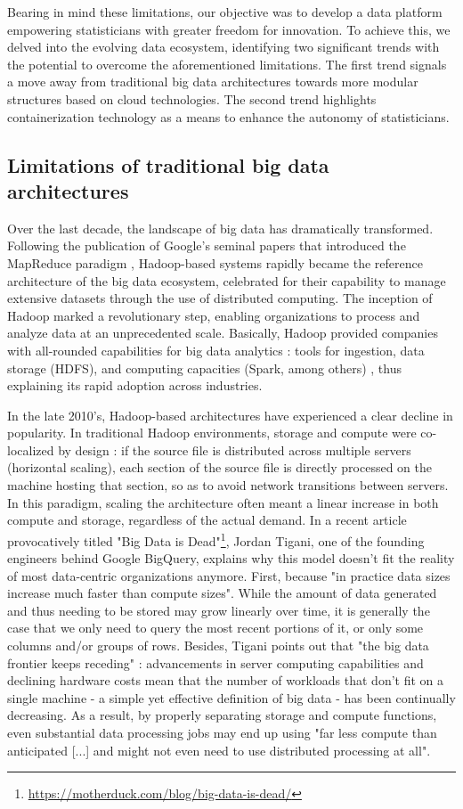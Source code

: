 Bearing in mind these limitations, our objective was to develop a data platform empowering statisticians with greater freedom for innovation. To achieve this, we delved into the evolving data ecosystem, identifying two significant trends with the potential to overcome the aforementioned limitations. The first trend signals a move away from traditional big data architectures towards more modular structures based on cloud technologies. The second trend highlights containerization technology as a means to enhance the autonomy of statisticians.

\subsection{Limitations of traditional big data architectures}

Over the last decade, the landscape of big data has dramatically transformed. Following the publication of Google's seminal papers that introduced the MapReduce paradigm \cite{ghemawat2003google, dean2008mapreduce}, Hadoop-based systems rapidly became the reference architecture of the big data ecosystem, celebrated for their capability to manage extensive datasets through the use of distributed computing. The inception of Hadoop marked a revolutionary step, enabling organizations to process and analyze data at an unprecedented scale. Basically, Hadoop provided companies with all-rounded capabilities for big data analytics : tools for ingestion, data storage (HDFS), and computing capacities (Spark, among others) \cite{dhyani2014big}, thus explaining its rapid adoption across industries.

In the late 2010's, Hadoop-based architectures have experienced a clear decline in popularity. In traditional Hadoop environments, storage and compute were co-localized by design : if the source file is distributed across multiple servers (horizontal scaling), each section of the source file is directly processed on the machine hosting that section, so as to avoid network transitions between servers. In this paradigm, scaling the architecture often meant a linear increase in both compute and storage, regardless of the actual demand. In a recent article provocatively titled "Big Data is Dead"\footnote{\url{https://motherduck.com/blog/big-data-is-dead/}}, Jordan Tigani, one of the founding engineers behind Google BigQuery, explains why this model doesn't fit the reality of most data-centric organizations anymore. First, because "in practice data sizes increase much faster than compute sizes". While the amount of data generated and thus needing to be stored may grow linearly over time, it is generally the case that we only need to query the most recent portions of it, or only some columns and/or groups of rows. Besides, Tigani points out that "the big data frontier keeps receding" : advancements in server computing capabilities and declining hardware costs mean that the number of workloads that don't fit on a single machine - a simple yet effective definition of big data - has been continually decreasing. As a result, by properly separating storage and compute functions, even substantial data processing jobs may end up using "far less compute than anticipated [...] and might not even need to use distributed processing at all".


